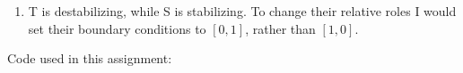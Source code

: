 \documentclass[10pt, preprint]{aastex}
\begin{document}
\begin{enumerate}
\item T is destabilizing, while S is stabilizing. To change their relative roles I would set their boundary conditions to $[0,1]$, rather than $[1,0]$.
\end{enumerate}
Code used in this assignment:

\end{document}
